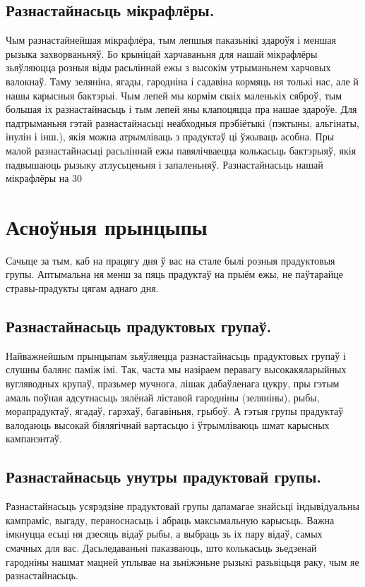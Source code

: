 \subsection{Разнастайнасьць мікрафлёры.}
Чым разнастайнейшая мікрафлёра, тым лепшыя паказьнікі здароўя і меншая рызыка захворваньняў. Бо крыніцай харчаваньня для нашай мікрафлёры зьяўляюцца розныя віды расьліннай ежы з высокім утрыманьнем харчовых валокнаў. Таму зеляніна, ягады, гародніна і садавіна кормяць ня толькі нас, але й нашы карысныя бактэрыі. Чым лепей мы кормім сваіх маленькіх сяброў, тым большая іх разнастайнасьць і тым лепей яны клапоцяцца пра нашае здароўе. Для падтрыманьня гэтай разнастайнасьці неабходныя прэбіётыкі (пэктыны, альгінаты, інулін і інш.), якія можна атрымліваць з прадуктаў ці ўжываць асобна. Пры малой разнастайнасьці расьліннай ежы павялічваецца колькасьць бактэрыяў, якія падвышаюць рызыку атлусьценьня і запаленьняў. Разнастайнасьць нашай мікрафлёры на 30%

\section{Асноўныя прынцыпы}

Сачыце за тым, каб на працягу дня ў вас на стале былі розныя прадуктовыя групы. Аптымальна ня менш за пяць прадуктаў на прыём ежы, не паўтарайце стравы-прадукты цягам аднаго дня.

\subsection{Разнастайнасьць прадуктовых групаў.}
Найважнейшым прынцыпам зьяўляецца разнастайнасьць прадуктовых групаў і слушны балянс паміж імі. Так, часта мы назіраем перавагу высокакяларыйных вугляводных крупаў, празьмер мучнога, лішак дабаўленага цукру, пры гэтым амаль поўная адсутнасьць зялёнай ліставой гародніны (зеляніны), рыбы, морапрадуктаў, ягадаў, гарэхаў, багавіньня, грыбоў. А гэтыя групы прадуктаў валодаюць высокай біялягічнай вартасьцю і ўтрымліваюць шмат карысных кампанэнтаў.

\subsection{Разнастайнасьць унутры прадуктовай групы.}
Разнастайнасьць усярэдзіне прадуктовай групы дапамагае знайсьці індывідуальны кампраміс, выгаду, пераноснасьць і абраць максымальную карысьць. Важна імкнуцца есьці ня дзесяць відаў рыбы, а выбраць зь іх пару відаў, самых смачных для вас. Дасьледаваньні паказваюць, што колькасьць зьедзенай гародніны нашмат мацней уплывае на зьніжэньне рызыкі разьвіцьця раку, чым яе разнастайнасьць.

